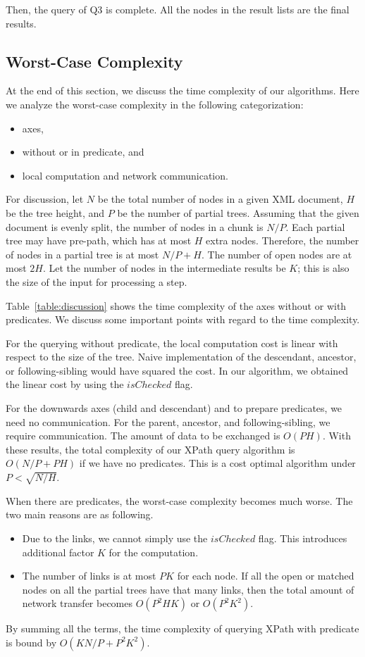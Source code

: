 Then, the query of Q3 is complete. All the nodes in the result lists are the final results.   


\subsection{Worst-Case Complexity}

At the end of this section, we discuss the time complexity of our algorithms. 
Here we analyze the worst-case complexity in the following categorization:
\begin{itemize}
\item axes,
\item without or in predicate, and
\item local computation and network communication.
\end{itemize}

For discussion, let $N$ be the total number of nodes in a given XML 
document, $H$ be the tree height, and $P$ be the number of partial trees.
Assuming that the given document is evenly split,
the number of nodes in a chunk is $N/P$.
Each partial tree may have pre-path, which has at most $H$ extra nodes.
Therefore, the number of nodes in a partial tree is at most $N/P + H$.
The number of open nodes are at most $2H$.
Let the number of nodes in the intermediate results be $K$; this is also the size of the input for processing a step.

Table~\ref{table:discussion} shows the time complexity of the axes without or with predicates.
We discuss some important points with regard to the time complexity.

For the querying without predicate, the local computation cost is linear with respect to the size of the tree.
Naive implementation of the descendant, ancestor, or following-sibling would have squared the cost.
In our algorithm, we obtained the linear cost by using the $\mathit{isChecked}$ flag.

For the downwards axes (child and descendant) and to prepare predicates, we need no communication.
For the parent, ancestor, and following-sibling, we require communication.
The amount of data to be exchanged is $O(PH)$.
With these results, the total complexity of our XPath query algorithm is
$O(N/P + PH)$ if we have no predicates.
This is a cost optimal algorithm under $P < \sqrt{N/H}$.


When there are predicates, the worst-case complexity becomes much worse.
The two main reasons are as following.
\begin{itemize}
\item Due to the links, we cannot simply use the $\mathit{isChecked}$ flag.
      This introduces additional factor $K$ for the computation.
\item The number of links is at most $PK$ for each node.
      If all the open or matched nodes on all the partial trees have that many links, then
      the total amount of network transfer becomes $O(P^2HK)$ or $O(P^2K^2)$.
\end{itemize}
By summing all the terms, the time complexity of querying XPath with predicate
is bound by $O(KN/P + P^2K^2)$.


